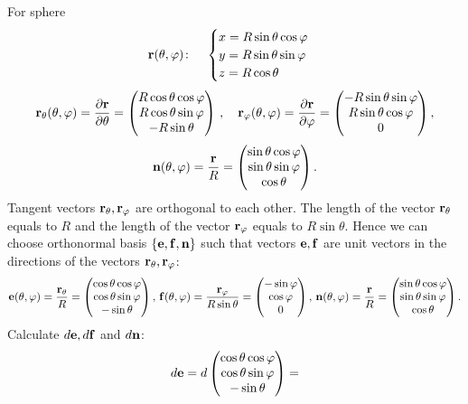 \documentclass[12pt]{article}
\theoremstyle{theorem}
\numberwithin{equation}{section}
\begin{document}
For sphere
\begin{equation}\label{surfacesphere11}
  {\bf r}(\theta,\varphi)\colon\quad
  \begin{cases}
  x=R\sin\theta\cos\varphi\\
  y=R\sin\theta\sin\varphi\\
  z=R\cos\theta\\
  \end{cases}
\end{equation}
    $$
  {\bf r}_\theta(\theta,\varphi)={\partial {\bf r}\over \partial \theta}=
  \begin{pmatrix}
        R\cos\theta\cos\varphi\cr
        R\cos\theta\sin\varphi\cr
        -R\sin\theta\cr
   \end{pmatrix}\,,
\quad
  {\bf r}_\varphi(\theta,\varphi)={\partial {\bf r}\over \partial \varphi}=
         \begin{pmatrix}
        -R\sin\theta\sin\varphi\cr
        R\sin\theta\cos\varphi\cr
          0\cr
   \end{pmatrix},
     $$
     $$
   {\bf n}(\theta,\varphi)={{\bf r}\over R}=
   \begin{pmatrix}
    \sin\theta\cos\varphi\cr
     \sin\theta\sin\varphi\cr
      \cos\theta\cr
   \end{pmatrix}.
  $$
Tangent vectors  ${\bf r}_\theta,{\bf r}_\varphi$ are orthogonal to each other.
The length of the vector ${\bf r}_\theta$ equals to $R$ and the
length of the vector ${\bf r}_\varphi$ equals to $R\sin\theta$.
Hence we can choose orthonormal basis $\{{\bf e},{\bf f},{\bf n}\}$ such that vectors ${\bf e},{\bf f}$ are unit vectors in the
directions of the vectors  ${\bf r}_\theta,{\bf r}_\varphi$:
         $$
    {\bf e}(\theta,\varphi)={{\bf r}_\theta\over R}=
         \begin{pmatrix}
        \cos\theta\cos\varphi\cr
        \cos\theta\sin\varphi\cr
        -\sin\theta\cr
   \end{pmatrix},\,
   {\bf f}(\theta,\varphi)={{\bf r}_\varphi\over R\sin\theta}=
        \begin{pmatrix}
        -\sin\varphi\cr
        \cos\varphi\cr
          0\cr
   \end{pmatrix},\,
     {\bf n}(\theta,\varphi)={{\bf r}\over R}=
   \begin{pmatrix}
    \sin\theta\cos\varphi\cr
     \sin\theta\sin\varphi\cr
      \cos\theta\cr
   \end{pmatrix}.
         $$
Calculate $d{\bf e}, d{\bf f}$ and $d{\bf n}$:
            $$
        d{\bf e}=d
        \begin{pmatrix}
        \cos\theta\cos\varphi\cr
        \cos\theta\sin\varphi\cr
        -\sin\theta\cr
   \end{pmatrix}=
           $$
\end{document}
